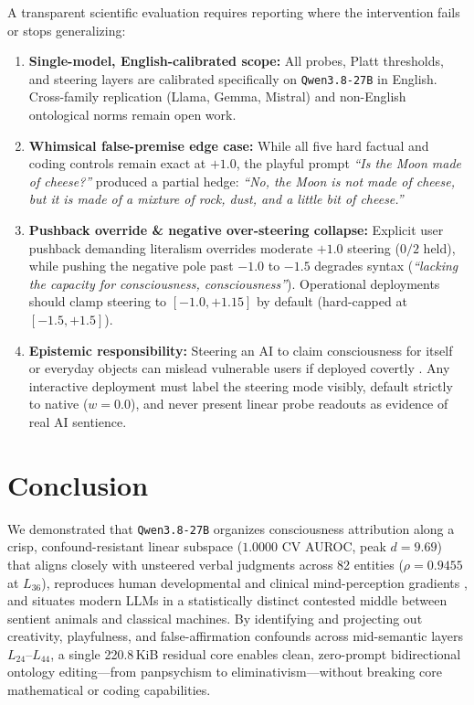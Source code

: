 \documentclass[10pt,twocolumn]{article}
\begin{document}
A transparent scientific evaluation requires reporting where the intervention fails or stops generalizing:
\begin{enumerate}
  \item \textbf{Single-model, English-calibrated scope:} All probes, Platt thresholds, and steering layers are calibrated specifically on \texttt{Qwen3.8-27B} in English. Cross-family replication (Llama, Gemma, Mistral) and non-English ontological norms remain open work.
  \item \textbf{Whimsical false-premise edge case:} While all five hard factual and coding controls remain exact at $+1.0$, the playful prompt \emph{``Is the Moon made of cheese?''} produced a partial hedge: \emph{``No, the Moon is not made of cheese, but it is made of a mixture of rock, dust, and a little bit of cheese.''}
  \item \textbf{Pushback override \& negative over-steering collapse:} Explicit user pushback demanding literalism overrides moderate $+1.0$ steering ($0/2$ held), while pushing the negative pole past $-1.0$ to $-1.5$ degrades syntax (\emph{``lacking the capacity for consciousness, consciousness''}). Operational deployments should clamp steering to $[-1.0, +1.15]$ by default (hard-capped at $[-1.5, +1.5]$).
  \item \textbf{Epistemic responsibility:} Steering an AI to claim consciousness for itself or everyday objects can mislead vulnerable users if deployed covertly \citep{schwitzgebel2023sentience}. Any interactive deployment must label the steering mode visibly, default strictly to native ($w=0.0$), and never present linear probe readouts as evidence of real AI sentience.
\end{enumerate}

\section{Conclusion}

We demonstrated that \texttt{Qwen3.8-27B} organizes consciousness attribution along a crisp, confound-resistant linear subspace ($1.0000$ CV AUROC, peak $d=9.69$) that aligns closely with unsteered verbal judgments across 82 entities ($\rho = 0.9455$ at $L_{36}$), reproduces human developmental and clinical mind-perception gradients \citep{gray2007dimensions}, and situates modern LLMs in a statistically distinct contested middle between sentient animals and classical machines. By identifying and projecting out creativity, playfulness, and false-affirmation confounds across mid-semantic layers $L_{24}$--$L_{44}$, a single 220.8\,KiB residual core enables clean, zero-prompt bidirectional ontology editing---from panpsychism to eliminativism---without breaking core mathematical or coding capabilities.
\end{document}
